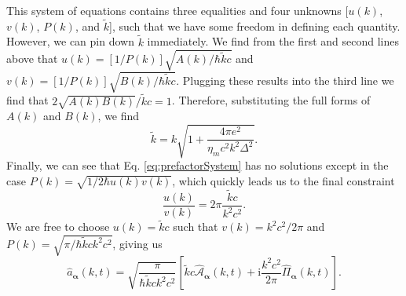 \documentclass{article}
\begin{document}
This system of equations contains three equalities and four unknowns [$u(k)$, $v(k)$, $P(k)$, and $\tilde{k}$], such that we have some freedom in defining each quantity. However, we can pin down $\tilde{k}$ immediately. We find from the first and second lines above that $u(k) = [1/P(k)]\sqrt{A(k)/\hbar\tilde{k}c}$ and $v(k) = [1/P(k)]\sqrt{B(k)/\hbar\tilde{k}c}$. Plugging these results into the third line we find that $2\sqrt{A(k)B(k)}/\tilde{k}c = 1$. Therefore, substituting the full forms of $A(k)$ and $B(k)$, we find
\begin{equation}
\tilde{k} = k\sqrt{1 + \frac{4\pi e^2}{\eta_mc^2k^2\Delta^2}}.
\end{equation}
Finally, we can see that Eq. \eqref{eq:prefactorSystem} has no solutions except in the case $P(k) = \sqrt{1/2\hbar u(k)v(k)}$, which quickly leads us to the final constraint
\begin{equation}
\frac{u(k)}{v(k)} = 2\pi\frac{\tilde{k}c}{k^2c^2}.
\end{equation}
We are free to choose $u(k) = \tilde{k}c$ such that $v(k) = k^2c^2/2\pi$ and $P(k) = \sqrt{\pi/\hbar\tilde{k}ck^2c^2}$, giving us
\begin{equation}
\hat{a}_{\bm{\alpha}}(k,t) = \sqrt{\frac{\pi}{\hbar\tilde{k}ck^2c^2}}\left[\tilde{k}c\hat{\mathcal{A}}_{\bm{\alpha}}(k,t) + \mathrm{i}\frac{k^2c^2}{2\pi}\hat{\mathit{\Pi}}_{\bm{\alpha}}(k,t)\right].
\end{equation}
\end{document}
